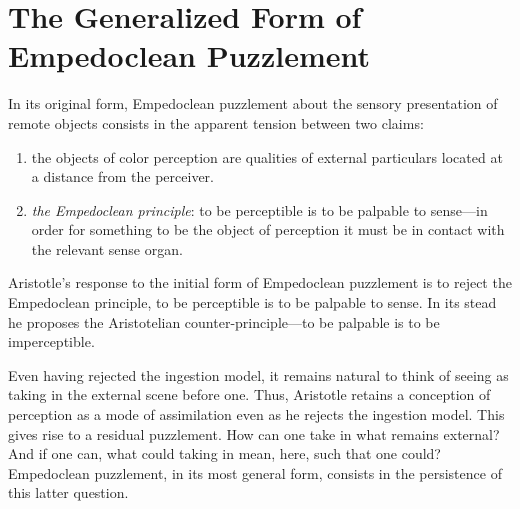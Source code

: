 
\section{The Generalized Form of Empedoclean Puzzlement} %
\label{sec:the_generalized_form_of_empedoclean_puzzlement}

In its original form, Empedoclean puzzlement about the sensory presentation of remote objects consists in the apparent tension between two claims:
\begin{enumerate}[(1)]
    \item the objects of color perception are qualities of external particulars located at a distance from the perceiver.
    \item \emph{the Empedoclean principle}: to be perceptible is to be palpable to sense---in order for something to be the object of perception it must be in contact with the relevant sense organ.
\end{enumerate}
Aristotle's response to the initial form of Empedoclean puzzlement is to reject the Empedoclean principle, to be perceptible is to be palpable to sense. In its stead he proposes the Aristotelian counter-principle---to be palpable is to be imperceptible. 

Even having rejected the ingestion model, it remains natural to think of seeing as taking in the external scene before one. Thus, Aristotle retains a conception of perception as a mode of assimilation even as he rejects the ingestion model. This gives rise to a residual puzzlement. How can one take in what remains external? And if one can, what could taking in mean, here, such that one could? Empedoclean puzzlement, in its most general form, consists in the persistence of this latter question.

